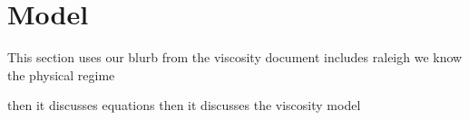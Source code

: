 \section{Model}

This section uses our blurb from the viscosity document
includes raleigh 
we know the physical regime

then it discusses equations
then it discusses the viscosity model


